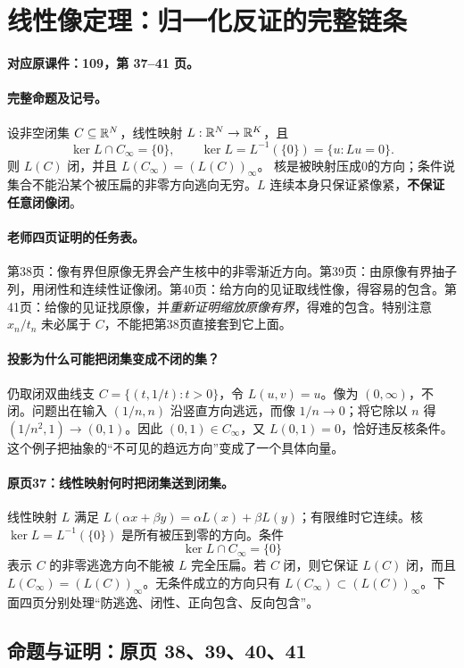 \clearpage\section{线性像定理：归一化反证的完整链条}\label{g:109:37}

\textbf{对应原课件：109，第 37--41 页。}


\paragraph{完整命题及记号。}
设非空闭集 $C\subseteq\mathbb{R}^N$，线性映射 $L:\mathbb{R}^N\to\mathbb{R}^K$，且
\[\ker L\cap C_\infty=\{0\},\qquad
\ker L=L^{-1}(\{0\})=\{u:Lu=0\}.
\]
则 $L(C)$ 闭，并且 $L(C_\infty)=(L(C))_\infty$。
核是被映射压成0的方向；条件说集合不能沿某个被压扁的非零方向逃向无穷。$L$ 连续本身只保证紧像紧，\textbf{不保证任意闭像闭}。
\paragraph{老师四页证明的任务表。}
第38页：像有界但原像无界会产生核中的非零渐近方向。第39页：由原像有界抽子列，用闭性和连续性证像闭。第40页：给方向的见证取线性像，得容易的包含。第41页：给像的见证找原像，并\emph{重新证明缩放原像有界}，得难的包含。特别注意 $x_n/t_n$ 未必属于 $C$，不能把第38页直接套到它上面。

\paragraph{投影为什么可能把闭集变成不闭的集？}
仍取闭双曲线支 $C=\{(t,1/t):t>0\}$，令 $L(u,v)=u$。像为 $(0,\infty)$，不闭。问题出在输入 $(1/n,n)$ 沿竖直方向逃远，而像 $1/n\to0$；将它除以 $n$ 得 $(1/n^2,1)\to(0,1)$。因此 $(0,1)\in C_\infty$，又 $L(0,1)=0$，恰好违反核条件。这个例子把抽象的“不可见的趋远方向”变成了一个具体向量。


\paragraph{原页37：线性映射何时把闭集送到闭集。}线性映射 $L$ 满足 $L(\alpha x+\beta y)=\alpha L(x)+\beta L(y)$；有限维时它连续。核 $\ker L=L^{-1}(\{0\})$ 是所有被压到零的方向。条件
\[\ker L\cap C_\infty=\{0\}\]
表示 $C$ 的非零逃逸方向不能被 $L$ 完全压扁。若 $C$ 闭，则它保证 $L(C)$ 闭，而且 $L(C_\infty)=(L(C))_\infty$。无条件成立的方向只有 $L(C_\infty)\subset(L(C))_\infty$。下面四页分别处理“防逃逸、闭性、正向包含、反向包含”。



\subsection{命题与证明：原页 38、39、40、41}

